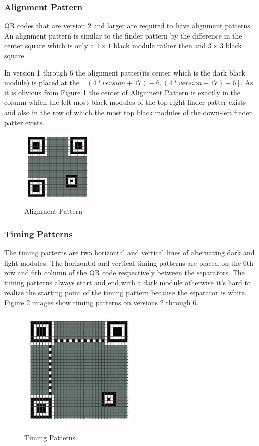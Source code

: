 \subsubsection{Alignment Pattern}

QR codes that are version 2 and larger are required to have alignment patterns. An alignment pattern is similar to the finder pattern by the difference in the center square which is only a $1\times1$ black module rather then and $3\times3$ black square.

In version 1 through 6 the alignment patter(its center which is the dark black module) is placed at the $[(4*version+17)-6,(4*version+17)-6]$. As it is obvious from Figure \ref{fig:25} the center of Alignment Pattern is exactly in the column which the left-most black modules of the top-right finder patter exists and also in the row of which the most top black modules of the down-left finder patter exists.
\begin{figure}[H]
  \caption{Alignment Pattern}
  \centering
    \includegraphics[width=0.3\textwidth]{figures/Alignmentpattern.jpg}
    \label{fig:25}
\end{figure}

\subsubsection{Timing Patterns}

The timing patterns are two horizontal and vertical lines of alternating dark and light modules. The horizontal and vertical timing patterns are placed on the 6th row and 6th column of the QR code respectively between the separators. The timing patterns always start and end with a dark module otherwise it's hard to
realize the starting point of the timing pattern because the separator is white. Figure \ref{fig:26} images show timing patterns on versions 2 through 6.

\begin{figure}[H]
  \caption{Timing Patterns}
  \centering
    \includegraphics[width=0.5\textwidth]{figures/Timingpattern.jpg}
    \label{fig:26}
\end{figure}

